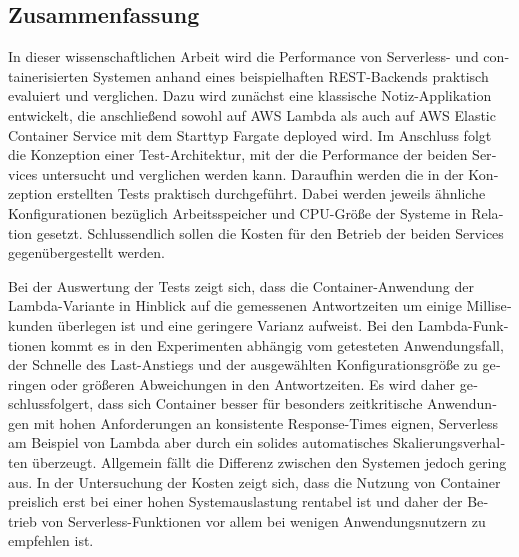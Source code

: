\begin{otherlanguage}{ngerman}
	\chapter*{Zusammenfassung}
In dieser wissenschaftlichen Arbeit wird die Performance von Serverless- und containerisierten Systemen anhand eines beispielhaften REST-Backends praktisch evaluiert und verglichen. Dazu wird zunächst eine klassische Notiz-Applikation entwickelt, die anschließend sowohl auf AWS Lambda als auch auf AWS Elastic Container Service mit dem Starttyp Fargate deployed wird. Im Anschluss folgt die Konzeption einer Test-Architektur, mit der die Performance der beiden Services untersucht und verglichen werden kann. Daraufhin werden die in der Konzeption erstellten Tests praktisch durchgeführt. Dabei werden jeweils ähnliche Konfigurationen bezüglich Arbeitsspeicher und CPU-Größe der Systeme in Relation gesetzt. Schlussendlich sollen die Kosten für den Betrieb der beiden Services gegenübergestellt werden.

Bei der Auswertung der Tests zeigt sich, dass die Container-Anwendung der Lambda-Variante in Hinblick auf die gemessenen Antwortzeiten um einige Millisekunden überlegen ist und eine geringere Varianz aufweist. Bei den Lambda-Funktionen kommt es in den Experimenten abhängig vom getesteten Anwendungsfall, der Schnelle des Last-Anstiegs und der ausgewählten Konfigurationsgröße zu geringen oder größeren Abweichungen in den Antwortzeiten. Es wird daher geschlussfolgert, dass sich Container besser für besonders zeitkritische Anwendungen mit hohen Anforderungen an konsistente Response-Times eignen, Serverless am Beispiel von Lambda aber durch ein solides automatisches Skalierungsverhalten überzeugt. Allgemein fällt die Differenz zwischen den Systemen jedoch gering aus. In der Untersuchung der Kosten zeigt sich, dass die Nutzung von Container preislich erst bei einer hohen Systemauslastung rentabel ist und daher der Betrieb von Serverless-Funktionen vor allem bei wenigen Anwendungsnutzern zu empfehlen ist. 

\end{otherlanguage}
